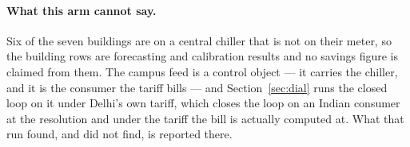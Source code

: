 \paragraph{What this arm cannot say.} Six of the seven buildings are on a
central chiller that is not on their meter, so the building rows are
forecasting and calibration results and no savings figure is claimed from them.
The campus feed is a control object --- it carries the chiller, and it is the
consumer the tariff bills --- and Section~\ref{sec:dial} runs the closed loop
on it under Delhi's own tariff, which closes the loop on an Indian consumer at
the resolution and under the tariff the bill is actually computed at. What that
run found, and did not find, is reported there.
